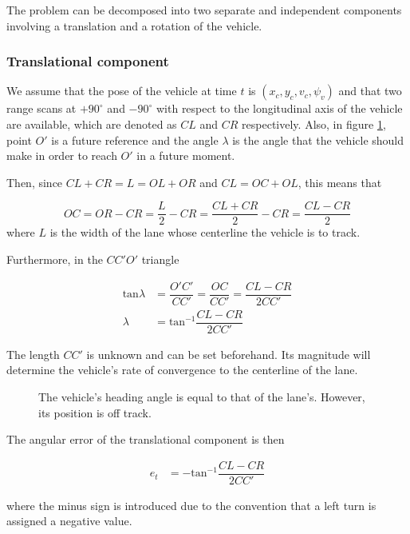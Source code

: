 The problem can be decomposed into two separate and independent
components involving a translation and a rotation of the vehicle.

\subsubsection{Translational component}

We assume that the pose of the vehicle at time $t$ is
$(x_c, y_c, v_c, \psi_v)$ and that two range scans at $+90^\circ$ and
$-90^\circ$ with respect to the longitudinal axis of the
vehicle are available, which are denoted as $CL$ and $CR$ respectively. Also,
in figure \ref{fig:centerline_pid_translation}, point $O'$ is a future
reference and the angle $\lambda$ is the angle that the vehicle should
make in order to reach $O'$ in a future moment.

Then, since $CL + CR = L = OL + OR$ and $CL = OC + OL$, this means that

\begin{equation}
  OC = OR - CR = \dfrac{L}{2} - CR = \dfrac{CL + CR}{2} - CR = \dfrac{CL-CR}{2}
\end{equation}
where $L$ is the width of the lane whose centerline the vehicle is to track.

Furthermore, in the $CC'O'$ triangle

\begin{align}
  \text{tan}\lambda &= \dfrac{O'C'}{CC'} = \dfrac{OC}{CC'} = \dfrac{CL-CR}{2CC'} \\
  \lambda &= \text{tan}^{-1}\dfrac{CL-CR}{2CC'}
\end{align}

The length $CC'$ is unknown and can be set beforehand. Its magnitude
will determine the vehicle's rate of convergence to the centerline of the
lane.

\begin{figure}[H]\centering
  \scalebox{1}{}
  \caption{The vehicle's heading angle is equal to that of the lane's.
    However, its position is off track.}
  \label{fig:centerline_pid_translation}
\end{figure}

The angular error of the translational component is then

\begin{align}
  e_t &= -\text{tan}^{-1}\dfrac{CL-CR}{2CC'}
\end{align}

where the minus sign is introduced due to the
convention that a left turn is assigned a negative value.

